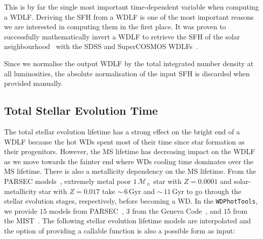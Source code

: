 \documentclass[fleqn,usenatbib]{rasti}
\newcommand{\msun}{\mathcal{M}_{\sun}}
\begin{document}
This is by far the single most important time-dependent variable when
computing a WDLF. Deriving the SFH from a WDLF is one of the most important
reasons we are interested in computing them in the first place. It was proven
to successfully mathematically invert a WDLF to retrieve the SFH of the solar
neighbourhood~\citep{2013MNRAS.434.1549R} with the SDSS and SuperCOSMOS
WDLFs~\citep{2006AJ....132.1221H, 2011MNRAS.417...93R}.

Since we normalise the output WDLF by the total integrated number density at
all luminosities, the absolute normalisation of the input SFH is discarded when
provided manually.

\subsection{Total Stellar Evolution Time}
\label{sec:evolution_time}
The total stellar evolution lifetime has a strong effect on the bright end of a
WDLF because the hot WDs spent most of their time since star formation as their
progenitors. However, the MS lifetime has decreasing impact on the WDLF as we
move towards the fainter end where WDs cooling time dominates over the MS
lifetime. There is also a metallicity dependency on the MS lifetime. From the
PARSEC models~\citep{2013EPJWC..4303001B}, extremely metal poor $1\,\msun$ star
with  $Z=0.0001$ and solar-metallicity star with $Z=0.017$ take $\sim$\,$6$\,Gyr
and $\sim$\,$11$\,Gyr to go through the stellar evolution stages, respectively,
before becoming a WD. In the \texttt{WDPhotTools}, we provide $15$ models from
PARSEC~\citep{2012MNRAS.427..127B, 2013EPJWC..4303001B, 2014MNRAS.444.2525C},
$3$ from the Geneva Code~\citep{2012A&A...537A.146E, 2012A&A...541A..41M,
2013A&A...553A..24G, 2013A&A...558A.103G}, and $15$ from the
MIST~\citep{2011ApJS..192....3P, 2013ApJS..208....4P, 2015ApJS..220...15P,
2016ApJS..222....8D, 2016ApJ...823..102C}. The following stellar evolution
lifetime models are interpolated and the option of providing a callable
function is also a possible form as input:
\end{document}

